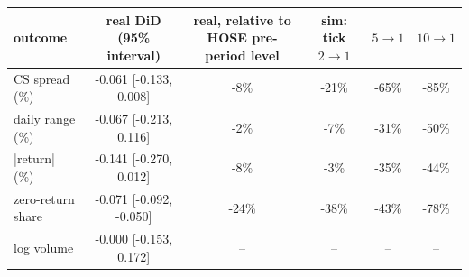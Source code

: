 \begin{tabular}{lccccc}
\toprule
outcome & real DiD (95\% interval) & real, relative to HOSE pre-period level & sim: tick $2\to1$ & $5\to1$ & $10\to1$ \\
\midrule
CS spread (\%) & -0.061 [-0.133, 0.008] & -8\% & -21\% & -65\% & -85\% \\
daily range (\%) & -0.067 [-0.213, 0.116] & -2\% & -7\% & -31\% & -50\% \\
|return| (\%) & -0.141 [-0.270, 0.012] & -8\% & -3\% & -35\% & -44\% \\
zero-return share & -0.071 [-0.092, -0.050] & -24\% & -38\% & -43\% & -78\% \\
log volume & -0.000 [-0.153, 0.172] & -- & -- & -- & -- \\
\bottomrule
\end{tabular}
